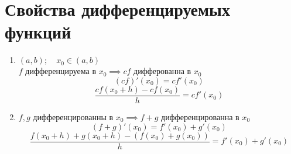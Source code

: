 \section{Свойства дифференцируемых функций}
\begin{properties}
	\begin{enumerate}
		\item $(a,b); \quad x_0 \in (a,b)$ \\
			$f$ дифференцируема в $x_0 \implies cf$ дифферованна в $x_0$
			\[
				(cf)'(x_0)=cf'(x_0)
			\]
			\[
			\displaystyle\frac{cf(x_0+h)-cf(x_0)}{h}=cf'(x_0)
			\]
		\item $f,g$ дифференцированны в  $x_0 \implies f+g$ дифференцированна в $x_0$
			\[
				(f+g)'(x_0)=f'(x_0)+g'(x_0)
			\]
			\[
			\displaystyle\frac{f(x_0+h)+g(x_0+h)-(f(x_0)+g(x_0))}{h}=f'(x_0)+g'(x_0)
			\] 
	\end{enumerate}
\end{properties}